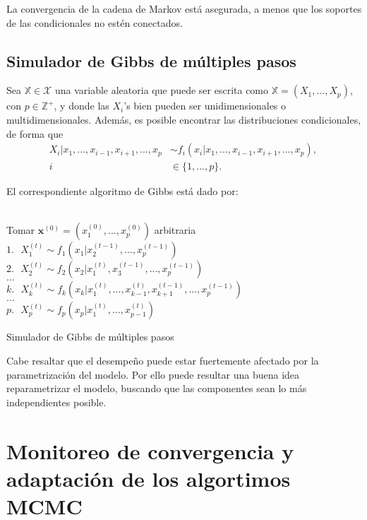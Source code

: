 La convergencia de la cadena de Markov está asegurada, a menos que los soportes de las condicionales no estén conectados.

\subsection{Simulador de Gibbs de múltiples pasos}

Sea $\mathbb{X} \in \mathcal{X}$ una variable aleatoria que puede ser escrita como $\mathbb{X} = (X_1,...,X_p)$, con $p \in \mathbb{Z}^+$, y donde las $X_i$'s bien pueden ser unidimensionales o multidimensionales. Además, es posible encontrar las distribuciones condicionales, de forma que
\begin{equation*}
\begin{aligned}
X_i|x_1,...,x_{i-1},x_{i+1},...,x_p &\sim f_i(x_i|x_1,...,x_{i-1},x_{i+1},...,x_p) \text{, }\\
i &\in \{1,...,p\}.
\end{aligned}
\end{equation*}

El correspondiente algoritmo de Gibbs está dado por:
\\ \\
\begin{algorithm}[H]
 Tomar $\textbf{x}^{(0)} = (x_1^{(0)},...,x_p^{(0)})$ arbitraria\;
 {
    $1. \text{ } X_1^{(t)} \sim f_1(x_1|x_2^{(t-1)},...,x_p^{(t-1)})\;$\\
    $2. \text{ } X_2^{(t)} \sim f_2(x_2|x_1^{(t)},x_3^{(t-1)},...,x_p^{(t-1)})\;$\\
    $...\;$\\
    $k.  \text{ } X_k^{(t)} \sim f_k(x_k|x_1^{(t)},...,x_{k-1}^{(t)},x_{k+1}^{(t-1)},...,x_p^{(t-1)})\;$\\
    $...\;$\\
    $p.  \text{ }X_p^{(t)} \sim f_p(x_p|x_1^{(t)},...,x_{p-1}^{(t)})\;$\\
 }
 \caption{Simulador de Gibbs de múltiples pasos}
\end{algorithm}
\BlankLine

Cabe resaltar que el desempeño puede estar fuertemente afectado por la parametrización del modelo. Por ello puede resultar una buena idea reparametrizar el modelo, buscando que las componentes sean lo más independientes posible.

\section {Monitoreo de convergencia y adaptación de los algortimos MCMC}

